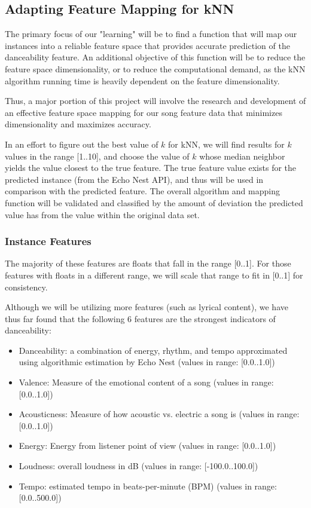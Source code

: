 \documentclass{article}
\begin{document}
\subsection{Adapting Feature Mapping for kNN}
The primary focus of our "learning" will be to find a function that will map our instances into a reliable feature space that provides accurate prediction of the danceability feature. An additional objective of this function will be to reduce the feature space dimensionality, or to reduce the computational demand, as the kNN algorithm running time is heavily dependent on the feature dimensionality. 

Thus, a major portion of this project will involve the research and development of an effective feature space mapping for our song feature data that minimizes dimensionality and maximizes accuracy.

In an effort to figure out the best value of $ k $ for kNN, we will find results for $ k $ values in the range [1..10], and choose the value of $ k $ whose median neighbor yields the  value closest to the true feature. The true feature value exists for the predicted instance (from the Echo Nest API), and thus will be used in comparison with the predicted feature. The overall algorithm and mapping function will be validated and classified by the amount of deviation the predicted value has from the value within the original data set.

\subsubsection{Instance Features}
The majority of these features are floats that fall in the range [0..1]. For those features with floats in a different range, we will scale that range to fit in [0..1] for consistency.

Although we will be utilizing more features (such as lyrical content), we have thus far found that the following 6 features are the strongest indicators of danceability:

\begin{itemize}
\item Danceability: a combination of energy, rhythm, and tempo approximated using algorithmic estimation by Echo Nest (values in range: [0.0..1.0])
\item Valence: Measure of the emotional content of a song (values in range: [0.0..1.0])
\item Acousticness: Measure of how acoustic vs. electric a song is (values in range: [0.0..1.0])
\item Energy: Energy from listener point of view (values in range: [0.0..1.0])
\item Loudness: overall loudness in dB (values in range: [-100.0..100.0])
\item Tempo: estimated tempo in beats-per-minute (BPM) (values in range: [0.0..500.0])
\end{itemize}
\end{document}
